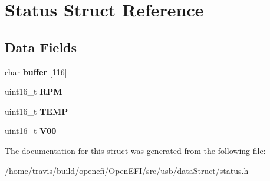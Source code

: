 \hypertarget{structStatus}{}\section{Status Struct Reference}
\label{structStatus}
\subsection*{Data Fields}
\begin{DoxyCompactItemize}
\item 
char {\bfseries buffer} \mbox{[}116\mbox{]}\hypertarget{structStatus_a9c6ca06770937b21734b06b6dc031e94}{}\label{structStatus_a9c6ca06770937b21734b06b6dc031e94}

\item 
uint16\+\_\+t {\bfseries R\+PM}\hypertarget{structStatus_aab3c9e3c338c18ff7ee00f6713024cd4}{}\label{structStatus_aab3c9e3c338c18ff7ee00f6713024cd4}

\item 
uint16\+\_\+t {\bfseries T\+E\+MP}\hypertarget{structStatus_ad30ed644cfa54545bc648c9e4493422f}{}\label{structStatus_ad30ed644cfa54545bc648c9e4493422f}

\item 
uint16\+\_\+t {\bfseries V00}\hypertarget{structStatus_a1dbec211c7079f8d0f546a3a6a3ae0c9}{}\label{structStatus_a1dbec211c7079f8d0f546a3a6a3ae0c9}

\end{DoxyCompactItemize}


The documentation for this struct was generated from the following file\+:\begin{DoxyCompactItemize}
\item 
/home/travis/build/openefi/\+Open\+E\+F\+I/src/usb/data\+Struct/status.\+h\end{DoxyCompactItemize}
